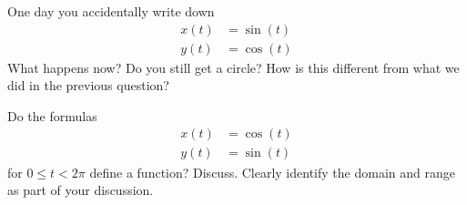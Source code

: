\begin{prob}
One day you accidentally write down
\begin{align*}
x(t) &= \sin(t)\\
y(t) &= \cos(t) 
\end{align*}
What happens now? Do you still get a circle? How is this different
from what we did in the previous question?
\end{prob}

\begin{prob}
Do the formulas 
\begin{align*}
x(t) &= \cos(t)\\
y(t) &= \sin(t) 
\end{align*}
for $0\le t< 2\pi$ define a function? Discuss. Clearly identify the
domain and range as part of your discussion.
\end{prob}


